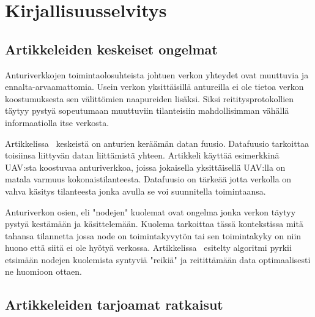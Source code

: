 \section{Kirjallisuusselvitys}

\subsection{Artikkeleiden keskeiset ongelmat}

Anturiverkkojen toimintaolosuhteista johtuen verkon yhteydet ovat muuttuvia ja
ennalta-arvaamattomia. Usein verkon yksittäisillä antureilla ei ole tietoa
verkon koostumuksesta sen välittömien naapureiden lisäksi. Siksi
reititysprotokollien täytyy pystyä sopeutumaan muuttuviin tilanteisiin
mahdollisimman vähällä informaatiolla itse verkosta.

Artikkelissa~\cite{Yu2006} keskeistä on anturien keräämän datan fuusio.
Datafuusio tarkoittaa toisiinsa liittyvän datan liittämistä yhteen. Artikkeli
käyttää esimerkkinä UAV:sta koostuvaa anturiverkkoa, joissa jokaisella
yksittäisellä UAV:lla on matala varmuus kokonaistilanteesta. Datafuusio on
tärkeää jotta verkolla on vahva käsitys tilanteesta jonka avulla se voi
suunnitella toimintaansa.

Anturiverkon osien, eli "nodejen" kuolemat ovat ongelma jonka verkon täytyy
pystyä kestämään ja käsittelemään. Kuolema tarkoittaa tässä kontekstissa mitä
tahansa tilannetta jossa node on toimintakyvytön tai sen toimintakyky on niin
huono että siitä ei ole hyötyä verkossa. Artikkelissa~\cite{Arya2015} esitelty
algoritmi pyrkii etsimään nodejen kuolemista syntyviä "reikiä" ja reitittämään
data optimaalisesti ne huomioon ottaen.

\subsection{Artikkeleiden tarjoamat ratkaisut}


